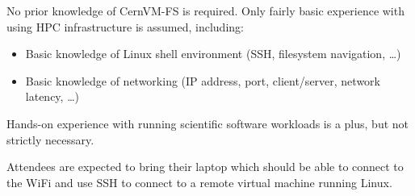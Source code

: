 No prior knowledge of CernVM-FS is required.
Only fairly basic experience with using HPC infrastructure is assumed, including:

\begin{itemize}
\item Basic knowledge of Linux shell environment (SSH, filesystem navigation, \ldots)
\item Basic knowledge of networking (IP address, port, client/server, network latency, \ldots)
\end{itemize}

\noindent Hands-on experience with running scientific software workloads is a plus, but not strictly necessary.

\noindent Attendees are expected to bring their laptop which should be able to connect to the WiFi and use SSH to connect to a remote virtual machine running Linux.


